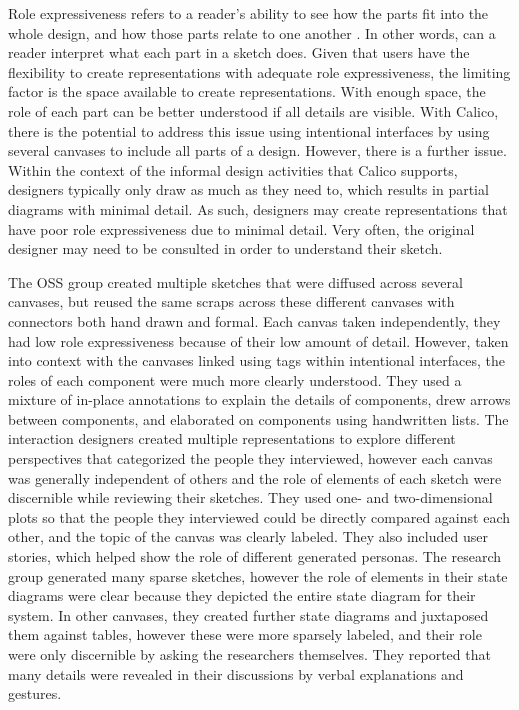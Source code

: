 Role expressiveness refers to a reader's ability to see how the parts fit into the whole design, and how those parts relate to one another \cite{Petre2013BookChapter}. In other words, can a reader interpret what each part in a sketch does. Given that users have the flexibility to create representations with adequate role expressiveness, the limiting factor is the space available to create representations. With enough space, the role of each part can be better understood if all details are visible. With Calico, there is the potential to address this issue using intentional interfaces by using several canvases to include all parts of a design. However, there is a further issue. Within the context of the informal design activities that Calico supports, designers typically only draw as much as they need to, which results in partial diagrams with minimal detail. As such, designers may create representations that have poor role expressiveness due to minimal detail. Very often, the original designer may need to be consulted in order to understand their sketch.

The OSS group created multiple sketches that were diffused across several canvases, but reused the same scraps across these different canvases with connectors both hand drawn and formal. Each canvas taken independently, they had low role expressiveness because of their low amount of detail. However, taken into context with the canvases linked using tags within intentional interfaces, the roles of each component were much more clearly understood. They used a mixture of in-place annotations to explain the details of components, drew arrows between components, and elaborated on components using handwritten lists. The interaction designers created multiple representations to explore different perspectives that categorized the people they interviewed, however each canvas was generally independent of others and the role of elements of each sketch were discernible while reviewing their sketches. They used one- and two-dimensional plots so that the people they interviewed could be directly compared against each other, and the topic of the canvas was clearly labeled. They also included user stories, which helped show the role of different generated personas. The research group generated many sparse sketches, however the role of elements in their state diagrams were clear because they depicted the entire state diagram for their system. In other canvases, they created further state diagrams and juxtaposed them against tables, however these were more sparsely labeled, and their role were only discernible by asking the researchers themselves. They reported that many details were revealed in their discussions by verbal explanations and gestures.

